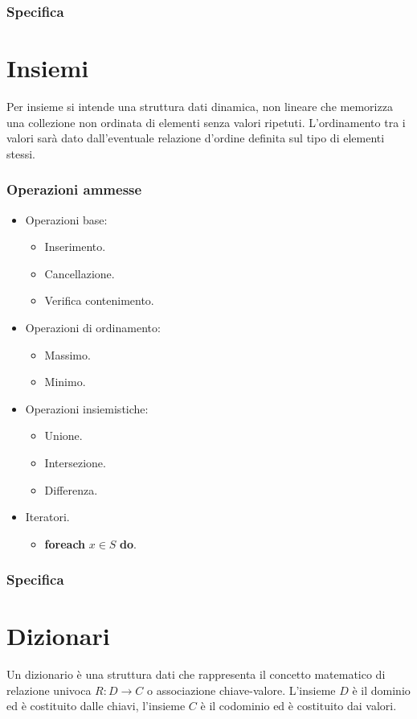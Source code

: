 \subsubsection{Specifica}

\section{Insiemi}
Per insieme si intende una struttura dati dinamica, non lineare che memorizza una collezione non ordinata di elementi senza valori ripetuti. L'ordinamento
tra i valori sar\`a dato dall'eventuale relazione d'ordine definita sul tipo di elementi stessi. 
\subsubsection{Operazioni ammesse}
\begin{multicols}{2}
\begin{itemize}
\item Operazioni base:
\begin{itemize}
\item Inserimento.
\item Cancellazione.
\item Verifica contenimento.
\end{itemize}
\item Operazioni di ordinamento:
\begin{itemize}
\item Massimo.
\item Minimo.
\end{itemize}
\item Operazioni insiemistiche:
\begin{itemize}
\item Unione.
\item Intersezione.
\item Differenza.
\end{itemize}
\item Iteratori.
\begin{itemize}
\item \textbf{foreach} $x\in S$ \textbf{do}.
\end{itemize}
\end{itemize}
\end{multicols}
\subsubsection{Specifica}

\section{Dizionari}
Un dizionario \`e una struttura dati che rappresenta il concetto matematico di relazione univoca $R:D\rightarrow C$ o associazione chiave-valore. L'insieme
$D$ \`e il dominio ed \`e costituito dalle chiavi, l'insieme $C$ \`e il codominio ed \`e costituito dai valori.
